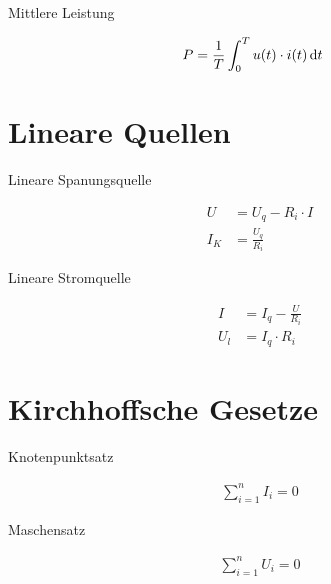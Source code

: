 \begin{boxleft}Mittlere Leistung
\end{boxleft}\begin{boxrightshaded}
\begin{align}
P&=\frac{1}{T}\int_0^T u(t)\cdot i(t)\mathop{}\!\mathrm{d} t 
\end{align}
\end{boxrightshaded}

\section{Lineare Quellen}
\begin{boxleft}Lineare Spanungsquelle
\end{boxleft}\begin{boxrightshaded}
\begin{align}
U&=U_q-R_i\cdot I\\
I_K&=\frac{U_q}{R_i}
\end{align}
\end{boxrightshaded}

\begin{boxleft}Lineare Stromquelle
\end{boxleft}\begin{boxrightshaded}
\begin{align}
I&=I_q-\frac{U}{R_i}\\
U_l&=I_q\cdot R_i
\end{align}
\end{boxrightshaded}

\section{Kirchhoffsche Gesetze}


\begin{boxleft}Knotenpunktsatz
\end{boxleft}\begin{boxrightshaded}
\begin{align}
\sum_{i=1}^n I_i=0
\end{align}
\end{boxrightshaded}

\begin{boxleft}Maschensatz
\end{boxleft}\begin{boxrightshaded}
\begin{align}
\sum_{i=1}^n U_i=0
\end{align}
\end{boxrightshaded}

